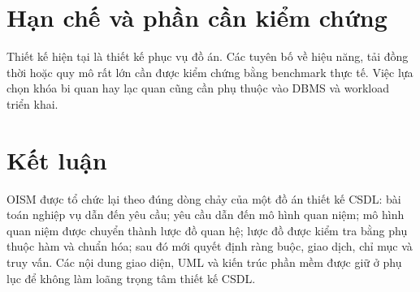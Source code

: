 \section{Hạn chế và phần cần kiểm chứng}

Thiết kế hiện tại là thiết kế phục vụ đồ án. Các tuyên bố về hiệu năng, tải đồng thời hoặc quy mô rất lớn cần được kiểm chứng bằng benchmark thực tế. Việc lựa chọn khóa bi quan hay lạc quan cũng cần phụ thuộc vào DBMS và workload triển khai.

\section{Kết luận}

OISM được tổ chức lại theo đúng dòng chảy của một đồ án thiết kế CSDL: bài toán nghiệp vụ dẫn đến yêu cầu; yêu cầu dẫn đến mô hình quan niệm; mô hình quan niệm được chuyển thành lược đồ quan hệ; lược đồ được kiểm tra bằng phụ thuộc hàm và chuẩn hóa; sau đó mới quyết định ràng buộc, giao dịch, chỉ mục và truy vấn. Các nội dung giao diện, UML và kiến trúc phần mềm được giữ ở phụ lục để không làm loãng trọng tâm thiết kế CSDL.
